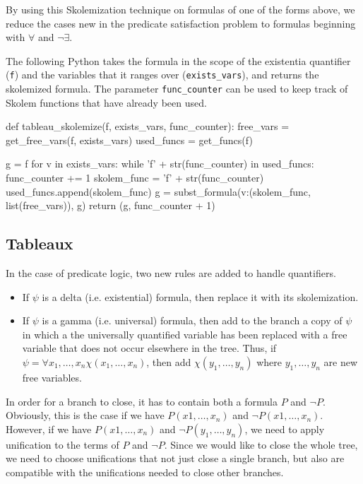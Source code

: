 \documentclass[a4paper,notitlepage]{scrartcl}
\begin{document}
By using this Skolemization technique on formulas of one of the
   forms above, we reduce the cases new in the predicate satisfaction
   problem to formulas beginning with $\forall$ and $\lnot\exists$. 

The following Python takes the formula in the scope of the 
   existentia quantifier (\texttt{f}) and the variables that it ranges
   over (\texttt{exists\_vars}), and returns the skolemized formula.
The parameter \texttt{func\_counter} can be used to keep track of Skolem 
   functions that have already been used.

\begin{code}
def tableau_skolemize(f, exists_vars, func_counter):
    free_vars = get_free_vars(f, exists_vars)
    used_funcs = get_funcs(f)

    g = f
    for v in exists_vars:
        while 'f' + str(func_counter) in used_funcs:
            func_counter += 1
        skolem_func = 'f' + str(func_counter)
        used_funcs.append(skolem_func)
        g = subst_formula({v:(skolem_func, list(free_vars))}, g)
    return (g, func_counter + 1)
\end{code}

\subsection{Tableaux}

In the case of predicate logic, two new rules are added to handle quantifiers.

\begin{itemize}
\item
If $\psi$ is a delta (i.e. existential) formula, then replace it with its
skolemization.

\item
If $\psi$ is a gamma (i.e. universal) formula, then add to the branch a copy of
$\psi$ in which a the universally quantified variable has been replaced with a
free variable that does not occur elsewhere in the tree. Thus, if $\psi =
\forall x_1, \ldots, x_n \chi(x_1, \ldots, x_n)$, then add $\chi(y_1, \ldots,
y_n)$ where $y_1, \ldots, y_n$ are new free variables.
\end{itemize}

In order for a branch to close, it has to contain both a formula $P$ and $\lnot
P$. Obviously, this is the case if we have $P(x1, \ldots, x_n)$ and $\lnot
P(x1, \ldots, x_n)$. However, if we have $P(x1, \ldots, x_n)$ and $\lnot P(y_1,
\ldots, y_n)$, we need to apply unification to the terms of $P$ and $\lnot P$.
Since we would like to close the whole tree, we need to choose unifications
that not just close a single branch, but also are compatible with the
unifications needed to close other branches.
\end{document}
